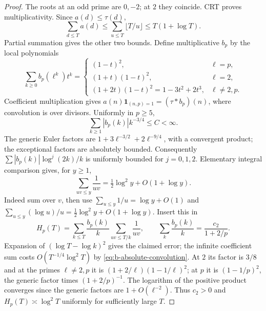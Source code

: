 \documentclass[11pt]{article}
\theoremstyle{definition}
\newcommand{\ind}{\mathbf 1}
\theoremstyle{remark}
\numberwithin{equation}{section}
\begin{document}
\begin{proof}
The roots at an odd prime are $0,-2$; at $2$ they coincide. CRT proves multiplicativity.
Since $a(d)\le\tau(d)$,
\begin{equation}\label{eq:b-pair-count}
 \sum_{d\le T}a(d)\le\sum_{u\le T}\lfloor T/u\rfloor\le T(1+\log T).
\end{equation}
Partial summation gives the other two bounds.
Define multiplicative $b_p$ by the local polynomials
\begin{equation}\label{eq:b-polynomials}
 \sum_{k\ge0}b_p(\ell^k)t^k=
 \begin{cases}
 (1-t)^2,&\ell=p,\\
 (1+t)(1-t)^2,&\ell=2,\\
 (1+2t)(1-t)^2=1-3t^2+2t^3,&\ell\ne2,p.
 \end{cases}
\end{equation}
Coefficient multiplication gives $a(n)\ind_{(n,p)=1}=(\tau*b_p)(n)$, where convolution is over divisors.
Uniformly in $p\ge5$,
\begin{equation}\label{eq:b-absolute-convolution}
 \sum_{k\ge1}|b_p(k)|k^{-3/4}\le C<\infty.
\end{equation}
The generic Euler factors are $1+3\ell^{-3/2}+2\ell^{-9/4}$, with a convergent product; the exceptional
factors are absolutely bounded. Consequently $\sum |b_p(k)|\log^j(2k)/k$ is uniformly bounded
for $j=0,1,2$. Elementary integral comparison gives, for $y\ge1$,
\begin{equation}\label{eq:b-double-harmonic}
 \sum_{uv\le y}\frac1{uv}=\tfrac12\log^2y+O(1+\log y).
\end{equation}
Indeed sum over $v$, then use $\sum_{u\le y}1/u=\log y+O(1)$ and
$\sum_{u\le y}(\log u)/u=\frac12\log^2y+O(1+\log y)$.
Insert this in
\begin{equation}\label{eq:b-harmonic-convolution}
 H_p(T)=\sum_{k\le T}\frac{b_p(k)}k\sum_{uv\le T/k}\frac1{uv},\qquad
 \sum_k\frac{b_p(k)}k=\frac{c_2}{1+2/p}.
\end{equation}
Expansion of $(\log T-\log k)^2$ gives the claimed error; the infinite coefficient sum costs
$O(T^{-1/4}\log^2T)$ by \eqref{eq:b-absolute-convolution}.
At $2$ its factor is $3/8$ and at the primes $\ell\ne2,p$ it is $(1+2/\ell)(1-1/\ell)^2$;
at $p$ it is $(1-1/p)^2$, the generic factor times $(1+2/p)^{-1}$. The logarithm of the positive product converges
since the generic factors are $1+O(\ell^{-2})$. Thus $c_2>0$ and $H_p(T)\asymp\log^2T$ uniformly
for sufficiently large $T$.
\end{proof}
\end{document}
